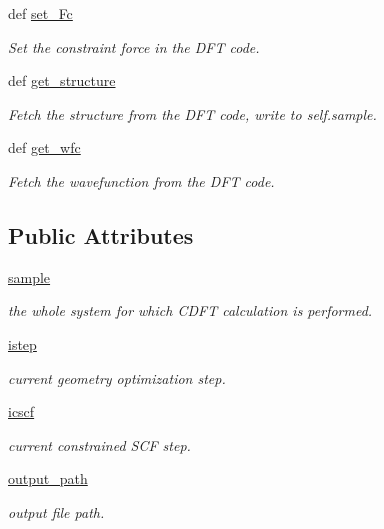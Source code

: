 \begin{DoxyCompactItemize}
def \hyperlink{classpycdft_1_1dft__driver_1_1base_1_1DFTDriver_a6238865b61ca7f87e11252eb6b47cd35}{set\-\_\-\-Fc}
\begin{DoxyCompactList}\small\item\em Set the constraint force in the D\-F\-T code. \end{DoxyCompactList}\item 
def \hyperlink{classpycdft_1_1dft__driver_1_1base_1_1DFTDriver_a837508252e4d56cf7c05444b6adac924}{get\-\_\-structure}
\begin{DoxyCompactList}\small\item\em Fetch the structure from the D\-F\-T code, write to self.\-sample. \end{DoxyCompactList}\item 
def \hyperlink{classpycdft_1_1dft__driver_1_1base_1_1DFTDriver_adb3dc45f52719bbd9766eed5efd35882}{get\-\_\-wfc}
\begin{DoxyCompactList}\small\item\em Fetch the wavefunction from the D\-F\-T code. \end{DoxyCompactList}\end{DoxyCompactItemize}
\subsection*{Public Attributes}
\begin{DoxyCompactItemize}
\item 
\hyperlink{classpycdft_1_1dft__driver_1_1base_1_1DFTDriver_ab58cf26b641c0ab31afcef18f4e0baca}{sample}
\begin{DoxyCompactList}\small\item\em the whole system for which C\-D\-F\-T calculation is performed. \end{DoxyCompactList}\item 
\hyperlink{classpycdft_1_1dft__driver_1_1base_1_1DFTDriver_a3e625b48fda9b8df72ebcea0a7dfc6f8}{istep}
\begin{DoxyCompactList}\small\item\em current geometry optimization step. \end{DoxyCompactList}\item 
\hyperlink{classpycdft_1_1dft__driver_1_1base_1_1DFTDriver_a73190c446a97dd79e2e6293f1c49c248}{icscf}
\begin{DoxyCompactList}\small\item\em current constrained S\-C\-F step. \end{DoxyCompactList}\item 
\hyperlink{classpycdft_1_1dft__driver_1_1base_1_1DFTDriver_a2f65382d24cd1e2935498a1c573b5ce5}{output\-\_\-path}
\begin{DoxyCompactList}\small\item\em output file path. \end{DoxyCompactList}\end{DoxyCompactItemize}


